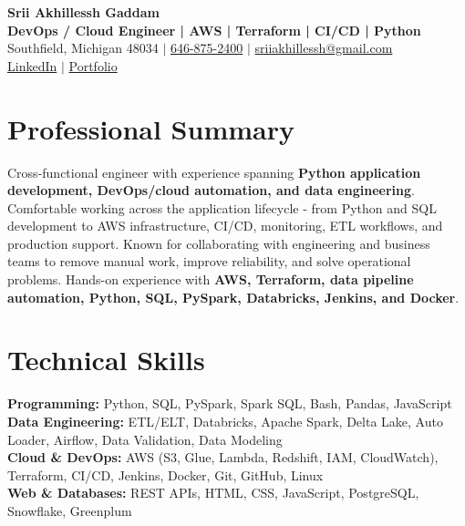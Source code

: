\documentclass[letterpaper,10pt]{article}
\begin{document}
\fontsize{9.35pt}{10.45pt}\selectfont

\begin{center}
    {\LARGE \textbf{Srii Akhillessh Gaddam}} \\[-1pt]
    \textbf{DevOps / Cloud Engineer | AWS | Terraform | CI/CD | Python} \\[2pt]
    Southfield, Michigan 48034 $|$
    \href{tel:6468752400}{646-875-2400} $|$
    \href{mailto:sriiakhillessh@gmail.com}{sriiakhillessh@gmail.com} \\[1pt]
    \href{https://www.linkedin.com/in/srii-akhiilessh-gaddam-b48668191/}{LinkedIn} $|$
    \href{https://sriiakhillesshg.github.io/portfolio/}{Portfolio}
\end{center}
\vspace{-8pt}

\section{Professional Summary}
\small{Cross-functional engineer with experience spanning \textbf{Python application development, DevOps/cloud automation, and data engineering}. Comfortable working across the application lifecycle - from Python and SQL development to AWS infrastructure, CI/CD, monitoring, ETL workflows, and production support. Known for collaborating with engineering and business teams to remove manual work, improve reliability, and solve operational problems. Hands-on experience with \textbf{AWS, Terraform, data pipeline automation, Python, SQL, PySpark, Databricks, Jenkins, and Docker}.}

\section{Technical Skills}
\small{
\textbf{Programming:} Python, SQL, PySpark, Spark SQL, Bash, Pandas, JavaScript \\
\textbf{Data Engineering:} ETL/ELT, Databricks, Apache Spark, Delta Lake, Auto Loader, Airflow, Data Validation, Data Modeling \\
\textbf{Cloud \& DevOps:} AWS (S3, Glue, Lambda, Redshift, IAM, CloudWatch), Terraform, CI/CD, Jenkins, Docker, Git, GitHub, Linux \\
\textbf{Web \& Databases:} REST APIs, HTML, CSS, JavaScript, PostgreSQL, Snowflake, Greenplum
}
\end{document}
